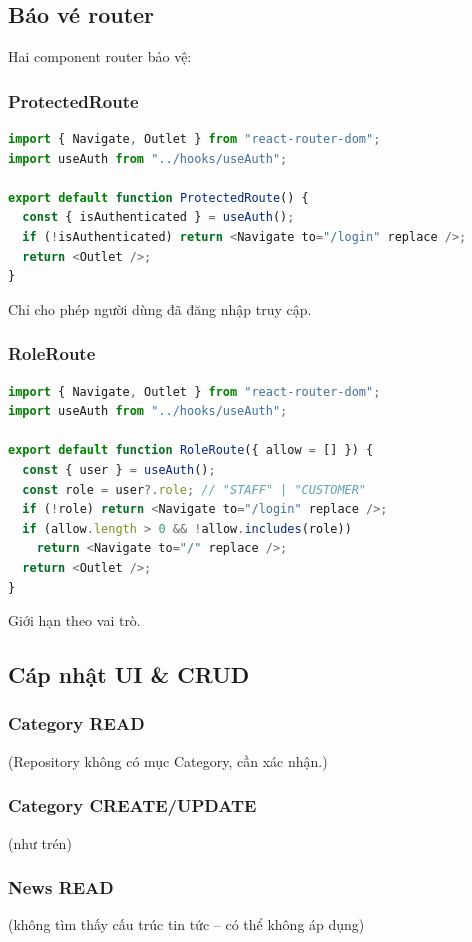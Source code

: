 \documentclass[12pt,a4paper]{article}
\begin{document}
\subsection{B\'ao v\'e router}
Hai component router bảo vệ:
\subsubsection{ProtectedRoute}
\begin{lstlisting}[language=JavaScript]
import { Navigate, Outlet } from "react-router-dom";
import useAuth from "../hooks/useAuth";

export default function ProtectedRoute() {
  const { isAuthenticated } = useAuth();
  if (!isAuthenticated) return <Navigate to="/login" replace />;
  return <Outlet />;
}
\end{lstlisting}
Chỉ cho phép người dùng đã đăng nhập truy cập.

\subsubsection{RoleRoute}
\begin{lstlisting}[language=JavaScript]
import { Navigate, Outlet } from "react-router-dom";
import useAuth from "../hooks/useAuth";

export default function RoleRoute({ allow = [] }) {
  const { user } = useAuth();
  const role = user?.role; // "STAFF" | "CUSTOMER"
  if (!role) return <Navigate to="/login" replace />;
  if (allow.length > 0 && !allow.includes(role))
    return <Navigate to="/" replace />;
  return <Outlet />;
}
\end{lstlisting}
Giới hạn theo vai trò.

\subsection{C\'ap nhật UI & CRUD}
\subsubsection{Category READ}
(Repository không có mục Category, cần xác nhận.)
\subsubsection{Category CREATE/UPDATE}
(như tr\'en)
\subsubsection{News READ}
(không tìm thấy cấu trúc tin tức – có thể không áp dụng)
\end{document}
